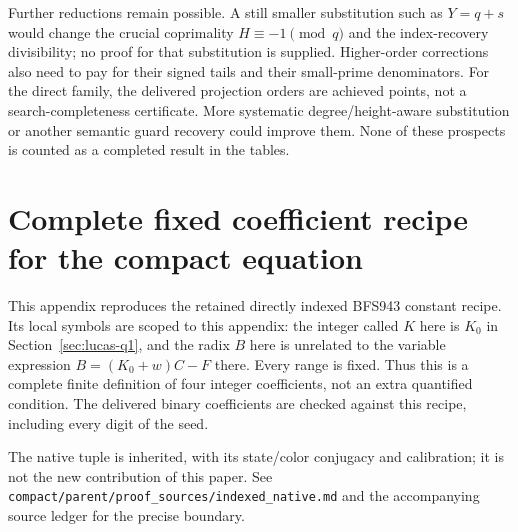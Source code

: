 \documentclass[11pt,letterpaper]{article}
\theoremstyle{definition}
\theoremstyle{remark}
\begin{document}
Further reductions remain possible.  A still smaller substitution such as
$Y=q+s$ would change the crucial coprimality $H\equiv-1\pmod q$ and the
index-recovery divisibility; no proof for that substitution is supplied.
Higher-order corrections also need to pay for their signed tails and their
small-prime denominators.  For the direct family, the delivered projection
orders are achieved points, not a search-completeness certificate.  More
systematic degree/height-aware substitution or another semantic guard
recovery could improve them.  None of these prospects is counted as a
completed result in the tables.

\appendix
\clearpage
\section{Complete fixed coefficient recipe for the compact equation}
\label{app:constants}
This appendix reproduces the retained directly indexed BFS943 constant recipe.
Its local symbols are scoped to this appendix: the integer called $K$ here is
$K_0$ in Section~\ref{sec:lucas-q1}, and the radix $B$ here is unrelated to
the variable expression $B=(K_0+w)C-F$ there.  Every range is fixed.  Thus
this is a complete finite definition of four integer coefficients, not an
extra quantified condition.  The delivered binary coefficients are checked
against this recipe, including every digit of the seed.

The native tuple is inherited, with its state/color conjugacy and calibration;
it is not the new contribution of this paper.  See
\texttt{compact/parent/proof\_sources/indexed\_native.md} and the accompanying
source ledger for the precise boundary.
\end{document}
